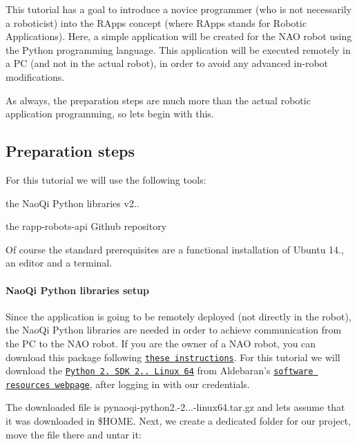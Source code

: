 This tutorial has a goal to introduce a novice programmer (who is not necessarily a roboticist) into the R\-Apps concept (where R\-Apps stands for Robotic Applications). Here, a simple application will be created for the N\-A\-O robot using the Python programming language. This application will be executed remotely in a P\-C (and not in the actual robot), in order to avoid any advanced in-\/robot modifications.

As always, the preparation steps are much more than the actual robotic application programming, so lets begin with this.

\subsection*{Preparation steps}

For this tutorial we will use the following tools\-:
\begin{DoxyItemize}
\item the Nao\-Qi Python libraries v2..
\item the {\ttfamily rapp-\/robots-\/api} Github repository
\end{DoxyItemize}

Of course the standard prerequisites are a functional installation of Ubuntu 14., an editor and a terminal.

\paragraph*{Nao\-Qi Python libraries setup}

Since the application is going to be remotely deployed (not directly in the robot), the Nao\-Qi Python libraries are needed in order to achieve communication from the P\-C to the N\-A\-O robot. If you are the owner of a N\-A\-O robot, you can download this package following \href{http://doc.aldebaran.com/2-1/dev/python/install_guide.html#linux}{\tt these instructions}. For this tutorial we will download the \href{https://community.aldebaran.com/en/dl/ZmllbGRfY29sbGVjdGlvbl9pdGVtLTc4NS1maWVsZF9zb2Z0X2RsX2V4dGVybmFsX2xpbmstMC03ZWY1ZjE%3D?width=500&height=auto}{\tt Python 2.\-7 S\-D\-K 2.\-1.\-4 Linux 64} from Aldebaran's \href{https://community.aldebaran.com/en/resources/software/language/en-gb}{\tt software resources webpage}, after logging in with our credentials.

The downloaded file is {\ttfamily pynaoqi-\/python2.-\/2...-\/linux64.\-tar.\-gz} and lets assume that it was downloaded in {\ttfamily \$\-H\-O\-M\-E}. Next, we create a dedicated folder for our project, move the file there and untar it\-:

